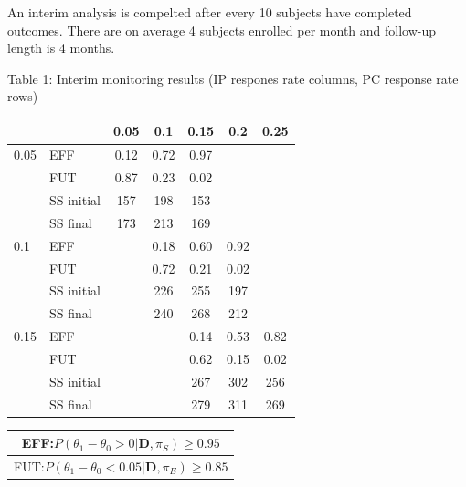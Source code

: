 \documentclass[12pt]{article}
\begin{document}
An interim analysis is compelted after every 10 subjects have completed outcomes. There are on average 4 subjects enrolled per month and follow-up length is 4 months.
\newpage
\begin{center}

Table 1: Interim monitoring results (IP respones rate columns, PC response rate rows)

\begin{tabular}{ll|ccccc}
	&		&	0.05	&	0.1	&	0.15	&	0.2	&	0.25	\\
\hline													
0.05	&	EFF	&	0.12	&	0.72	&	0.97	&		&		\\
	&	FUT	&	0.87	&	0.23	&	0.02	&		&		\\
	&	SS initial	&	157	&	198	&	153	&		&		\\
	&	SS final	&	173	&	213	&	169	&		&		\\
\hline													
0.1	&	EFF	&		&	0.18	&	0.60	&	0.92	&		\\
	&	FUT	&		&	0.72	&	0.21	&	0.02	&		\\
	&	SS initial	&		&	226	&	255	&	197	&		\\
	&	SS final	&		&	240	&	268	&	212	&		\\
\hline													
0.15	&	EFF	&		&		&	0.14	&	0.53	&	0.82	\\
	&	FUT	&		&		&	0.62	&	0.15	&	0.02	\\
	&	SS initial	&		&		&	267	&	302	&	256	\\
	&	SS final	&		&		&	279	&	311	&	269	\\
\hline													
										

\end{tabular}



\begin{tabular}{|c|}
\hline
EFF:$P(\theta_1-\theta_0>0|\textbf{D},\pi_S)\geq 0.95$\\
\hline
FUT:$P(\theta_1-\theta_0<0.05|\textbf{D},\pi_E)\geq 0.85$\\
\hline
\end{tabular}
\end{center}
\newpage
\end{document}
